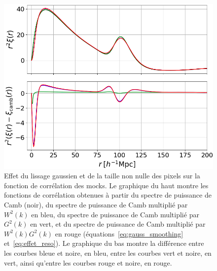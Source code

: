 \begin{figure}
  \centering
  \includegraphics[scale=0.38]{xi_smoothing}
  \caption{Effet du lissage gaussien et de la taille non nulle des pixels sur la fonction de corrélation des mocks. Le graphique du haut montre les fonctions de corrélation obtenues à partir du spectre de puissance de Camb (noir), du spectre de puissance de Camb multiplié par $W^2(k)$ en bleu, du spectre de puissance de Camb multiplié par $G^2(k)$ en vert, et du spectre de puissance de Camb multiplié par $W^2(k)G^2(k)$ en rouge (équations~\ref{eq:gauss_smoothing} et~\ref{eq:effet_reso}). Le graphique du bas montre la différence entre les courbes bleue et noire, en bleu, entre les courbes vert et noire, en vert, ainsi qu'entre les courbes rouge et noire, en rouge.}
  \label{fig:xi_smoothing}
\end{figure}
